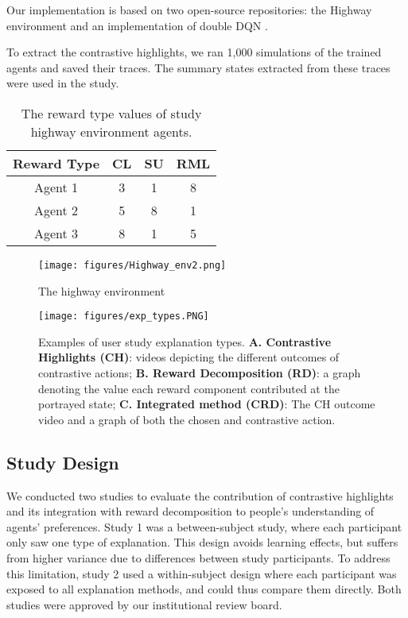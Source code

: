 \documentclass{ecai}
\begin{document}
Our implementation is based on two open-source repositories: the Highway environment and an implementation of double DQN \cite{highway-env,rl-agents}.


To extract the contrastive highlights, we ran 1,000 simulations of the trained agents and saved their traces. The summary states extracted from these traces were used in the study.

\begin{table}
    \centering
    \begin{tabular}{|c|c c c |}
        \hline
        Reward Type  & CL  & SU & RML  \\
        \hline
        Agent 1 & 3 & 1 & 8  \\
        
        Agent 2 & 5 & 8 & 1  \\
         
        Agent 3 & 8 & 1 & 5 \\
        
        \hline
        
    \end{tabular}
    \caption{The reward type values of study highway environment agents.}
    \label{tab:reward setting}
        \vspace{-0.3cm}

\end{table}

\begin{figure}
\centering
\texttt{[image: figures/Highway\_env2.png]}
\caption{The highway environment}
\label{fig:highway environment}
\end{figure}

\begin{figure}[t]
\centering
\texttt{[image: figures/exp\_types.PNG]}
\caption{Examples of user study explanation types. \textbf{A. Contrastive Highlights (CH)}: videos depicting the different outcomes of contrastive actions; \textbf{B. Reward Decomposition (RD)}: a graph denoting the value each reward component contributed at the portrayed state; \textbf{C. Integrated method (CRD)}: The CH outcome video and a graph of both the chosen and contrastive action.}
\label{fig:exp_types}
\end{figure}

\subsection{Study Design}
We conducted two studies to evaluate the contribution of contrastive highlights and its integration with reward decomposition to people's understanding of agents' preferences. Study 1 was a between-subject study, where each participant only saw one type of explanation. This design avoids learning effects, but suffers from higher variance due to differences between study participants. To address this limitation, study 2 used a within-subject design where each participant was exposed to all explanation methods, and could thus compare them directly.  Both studies were approved by our institutional review board.
\end{document}
